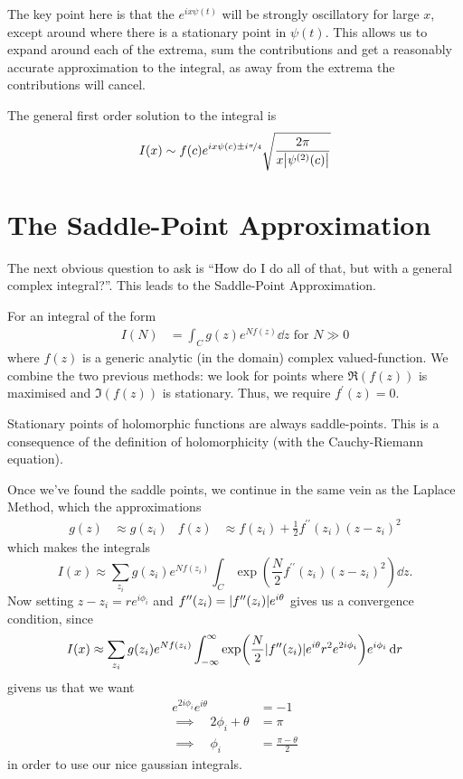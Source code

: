 \documentclass[a4paper,12pt,parskip=full,BCOR=1cm]{scrreprt}
\begin{document}
The key point here is that the $e^{ix\psi(t)}$ will be strongly oscillatory for large $x$, except around where there is a stationary point in $\psi(t)$.
This allows us to expand around each of the extrema, sum the contributions and get a reasonably accurate approximation to the integral, as away from the extrema the contributions will cancel.

The general first order solution to the integral is
\begin{align*}
 I(x)\sim f(c)e^{ix\psi(c)\pm i\nicefrac{\pi}{4}}\sqrt\frac{2\pi}{x\abs{\psi^{(2)}(c)}}
\end{align*}

\section{The Saddle-Point Approximation}
The next obvious question to ask is ``How do I do all of that, but with a general complex integral?''.
This leads to the Saddle-Point Approximation.

For an integral of the form
\begin{align*}
 I(N) & = \int_C g(z)e^{Nf(z)}\dd{z} \text{ for }N\gg 0
\end{align*}
where $f(z)$ is a generic analytic (in the domain) complex valued-function.
We combine the two previous methods: we look for points where $\Re(f(z))$ is maximised and $\Im(f(z))$ is stationary.
Thus, we require $f^\prime(z)=0$.

\begin{note}
 Stationary points of holomorphic functions are always saddle-points.
This is a consequence of the definition of holomorphicity (with the Cauchy-Riemann equation).
\end{note}

Once we've found the saddle points, we continue in the same vein as the Laplace Method, which the approximations
\begin{align*}
 g(z) & \approx g(z_i) & f(z) & \approx f(z_i) + \frac{1}{2}f^{\prime\prime}(z_i)(z-z_i)^2
\end{align*}
which makes the integrals
$$ I(x) \approx \sum_{z_i} g(z_i)e^{Nf(z_i)} \int_C \exp(\frac{N}{2}f^{\prime\prime}(z_i)(z-z_i)^2)\dd{z}.$$
Now setting $z-z_i=re^{i\phi_i}$ and $f^{\prime\prime}(z_i)=\abs{f^{\prime\prime}(z_i)}e^{i\theta}$ gives us a convergence condition, since
$$I(x)\approx \sum_{z_i} g(z_i)e^{Nf(z_i)} \int_{-\infty}^\infty \exp(\frac{N}{2}\abs{f^{\prime\prime}(z_i)}e^{i\theta}r^2e^{2i\phi_i})e^{i\phi_i}\dd{r}$$ givens us that we want
\begin{align*}
 e^{2 i\phi_i}e^{i\theta}        & = -1                     \\
 \implies \quad 2\phi_i + \theta & = \pi                    \\
 \implies \quad \phi_i           & = \frac{\pi - \theta}{2}
\end{align*} in order to use our nice gaussian integrals.
\end{document}
